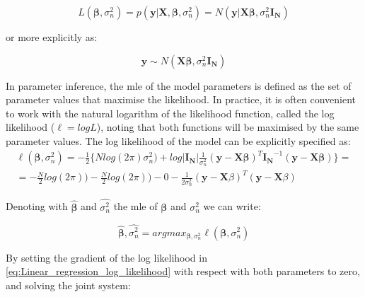 \begin{equation} \label{eq:Linear_regression_likelihood}
 L(\boldsymbol{\beta}, \sigma_n^2) = p(\mathbf{y}| \mathbf{X}, \boldsymbol{\beta}, \sigma_n^2) = N(\mathbf{y} | \mathbf{X}\boldsymbol{\beta}, \sigma_n^2 \mathbf{I_N}) 
\end{equation}

or more explicitly as:

\begin{equation} \label{eq:Linear_regression_MVN_form}
\mathbf{y} \sim N(\mathbf{X}\boldsymbol{\beta}, \sigma_n^2 \mathbf{I_N}) 
\end{equation}

In parameter inference, the \gls{mle} of the model parameters is defined as the set of parameter values that maximise the likelihood.
In practice, it is often convenient to work with the natural logarithm of the likelihood function, called the log likelihood ($\ell = logL$), noting that both functions will be maximised by the same parameter values.
The log likelihood of the model can be explicitly specified as:\\

\begin{equation} \label{eq:Linear_regression_log_likelihood}
\begin{split}
 \ell(\boldsymbol{\beta}, \sigma_n^2) = -\frac{1}{2} \bigg\{Nlog(2\pi)\sigma_n^2) + log|\mathbf{I_N}| \frac{1}{\sigma_n^2}(\mathbf{y}-\mathbf{X}\boldsymbol{\beta})^T\mathbf{I_N}^{-1}(\mathbf{y}-\mathbf{X}\boldsymbol{\beta}) \bigg\}  = \\
= -\frac{N}{2}log(2\pi)) - \frac{N}{2}log(2\pi))- 0 - \frac{1}{2\sigma_n^2}(\mathbf{y}-\mathbf{X}\beta)^T(\mathbf{y}-\mathbf{X}\beta)  
\end{split}
\end{equation}

Denoting with $\hat{\boldsymbol{\beta}}$ and $\hat{\sigma_n^2}$ the \gls{mle} of $\boldsymbol{\beta}$ and $\sigma_n^2$ we can write:

\begin{equation} \label{eq:Linear_regression_MLEs}
\hat{\boldsymbol{\beta}},\hat{\sigma_n^2} = argmax_{\boldsymbol{\beta},\sigma_n^2}\ell(\boldsymbol{\beta}, \sigma_n^2) 
\end{equation} 

By setting the gradient of the log likelihood in \eqref{eq:Linear_regression_log_likelihood} with respect with both parameters to zero, and solving the joint system:

